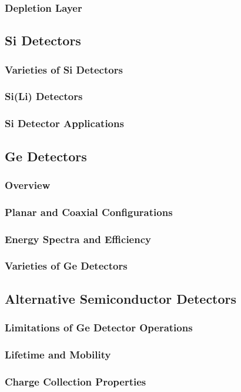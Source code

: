 \subsubsection{Depletion Layer}

\subsection{Si Detectors}
\subsubsection{Varieties of Si Detectors}
\subsubsection{Si(Li) Detectors}
\subsubsection{Si Detector Applications}

\subsection{Ge Detectors}
\subsubsection{Overview}
\subsubsection{Planar and Coaxial Configurations}
\subsubsection{Energy Spectra and Efficiency}
\subsubsection{Varieties of Ge Detectors}

\subsection{Alternative Semiconductor Detectors}
\subsubsection{Limitations of Ge Detector Operations}
\subsubsection{Lifetime and Mobility}
\subsubsection{Charge Collection Properties}